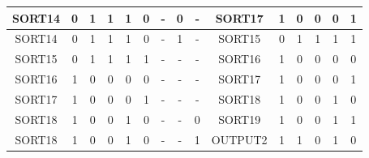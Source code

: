 \begin{table}[H]
{\begin{tabular}{|cccccc|ccc|cccccc|}
\multicolumn{1}{|c|}{SORT14}  & \multicolumn{1}{c|}{0}  & \multicolumn{1}{c|}{1}  & \multicolumn{1}{c|}{1}  & \multicolumn{1}{c|}{1}  & 0  & \multicolumn{1}{c|}{-}    & \multicolumn{1}{c|}{0}        & -    & \multicolumn{1}{c|}{SORT17}  & \multicolumn{1}{c|}{1}  & \multicolumn{1}{c|}{0}  & \multicolumn{1}{c|}{0}  & \multicolumn{1}{c|}{0}  & 1  \\ \hline
\multicolumn{1}{|c|}{SORT14}  & \multicolumn{1}{c|}{0}  & \multicolumn{1}{c|}{1}  & \multicolumn{1}{c|}{1}  & \multicolumn{1}{c|}{1}  & 0  & \multicolumn{1}{c|}{-}    & \multicolumn{1}{c|}{1}        & -    & \multicolumn{1}{c|}{SORT15}  & \multicolumn{1}{c|}{0}  & \multicolumn{1}{c|}{1}  & \multicolumn{1}{c|}{1}  & \multicolumn{1}{c|}{1}  & 1  \\ \hline
\multicolumn{1}{|c|}{SORT15}  & \multicolumn{1}{c|}{0}  & \multicolumn{1}{c|}{1}  & \multicolumn{1}{c|}{1}  & \multicolumn{1}{c|}{1}  & 1  & \multicolumn{1}{c|}{-}    & \multicolumn{1}{c|}{-}        & -    & \multicolumn{1}{c|}{SORT16}  & \multicolumn{1}{c|}{1}  & \multicolumn{1}{c|}{0}  & \multicolumn{1}{c|}{0}  & \multicolumn{1}{c|}{0}  & 0  \\ \hline
\multicolumn{1}{|c|}{SORT16}  & \multicolumn{1}{c|}{1}  & \multicolumn{1}{c|}{0}  & \multicolumn{1}{c|}{0}  & \multicolumn{1}{c|}{0}  & 0  & \multicolumn{1}{c|}{-}    & \multicolumn{1}{c|}{-}        & -    & \multicolumn{1}{c|}{SORT17}  & \multicolumn{1}{c|}{1}  & \multicolumn{1}{c|}{0}  & \multicolumn{1}{c|}{0}  & \multicolumn{1}{c|}{0}  & 1  \\ \hline
\multicolumn{1}{|c|}{SORT17}  & \multicolumn{1}{c|}{1}  & \multicolumn{1}{c|}{0}  & \multicolumn{1}{c|}{0}  & \multicolumn{1}{c|}{0}  & 1  & \multicolumn{1}{c|}{-}    & \multicolumn{1}{c|}{-}        & -    & \multicolumn{1}{c|}{SORT18}  & \multicolumn{1}{c|}{1}  & \multicolumn{1}{c|}{0}  & \multicolumn{1}{c|}{0}  & \multicolumn{1}{c|}{1}  & 0  \\ \hline
\multicolumn{1}{|c|}{SORT18}  & \multicolumn{1}{c|}{1}  & \multicolumn{1}{c|}{0}  & \multicolumn{1}{c|}{0}  & \multicolumn{1}{c|}{1}  & 0  & \multicolumn{1}{c|}{-}    & \multicolumn{1}{c|}{-}        & 0    & \multicolumn{1}{c|}{SORT19}  & \multicolumn{1}{c|}{1}  & \multicolumn{1}{c|}{0}  & \multicolumn{1}{c|}{0}  & \multicolumn{1}{c|}{1}  & 1  \\ \hline
\multicolumn{1}{|c|}{SORT18}  & \multicolumn{1}{c|}{1}  & \multicolumn{1}{c|}{0}  & \multicolumn{1}{c|}{0}  & \multicolumn{1}{c|}{1}  & 0  & \multicolumn{1}{c|}{-}    & \multicolumn{1}{c|}{-}        & 1    & \multicolumn{1}{c|}{OUTPUT2} & \multicolumn{1}{c|}{1}  & \multicolumn{1}{c|}{1}  & \multicolumn{1}{c|}{0}  & \multicolumn{1}{c|}{1}  & 0  \\ \hline

\end{tabular}}
\end{table}
